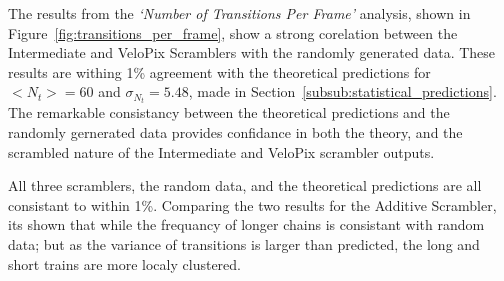 			
			The results from the \textit{`Number of Transitions Per Frame'} analysis, shown in Figure~\ref{fig:transitions_per_frame}, show a strong corelation between the Intermediate and VeloPix Scramblers with the randomly generated data. 
			These results are withing 1\% agreement with the theoretical predictions for $<N_t> = 60$ and $\sigma_{N_t} = 5.48$, made in Section~\ref{subsub:statistical_predictions}. 
			The remarkable consistancy between the theoretical predictions and the randomly gernerated data provides confidance in both the theory, and the scrambled nature of the Intermediate and VeloPix scrambler outputs.
			\par
			All three scramblers, the random data, and the theoretical predictions are all consistant to within 1\%. Comparing the two results for the Additive Scrambler, its shown that while the frequancy of longer chains is consistant with random data; but as the variance of transitions is larger than predicted, the long and short trains are more localy clustered. 


